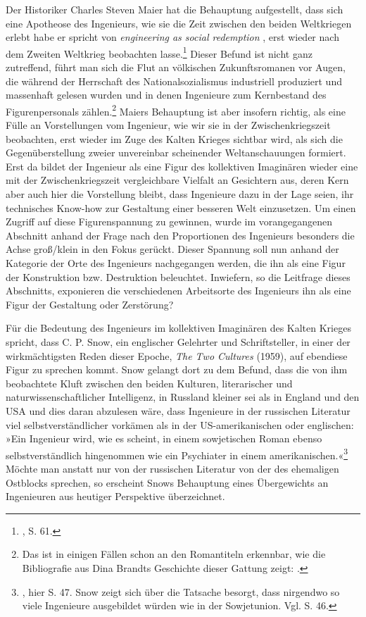 \documentclass[%
	fontsize=10pt,%
	twoside,%
	headings=optiontoheadandtoc,%
	showtrims]{scrbook}
\newcommand{\antiqua}[3]{%
	\fontsize{#1}{#2}%
	\Lyon%
	\addfontfeature{LetterSpace=#3}%
	\selectfont%
}
\newcommand{\regularfontantiqua}{%
	\normalfont%
	\antiqua{9.3bp}{12bp}{.05}%
}
\newcommand{\regularfontdefault}{%
	\regularfontantiqua%
}
\begin{document}
					\-
					\par			
					\newpage%
					\noindent%
					\regularfontdefault%
	\par\noindent Der Historiker Charles Steven Maier hat die Behauptung aufgestellt, dass sich eine Apotheose des Ingenieurs, wie sie die Zeit zwischen den beiden Weltkriegen erlebt habe \textendash{} er spricht von \emph{engineering as social redemption} \textendash{}, erst wieder nach dem Zweiten Weltkrieg beobachten lasse.\footnote{\cite[][]{maier1970a}, S. 61.}  Dieser Befund ist nicht ganz zutreffend, führt man sich die Flut an völkischen Zukunftsromanen vor Augen, die während der Herrschaft des Nationalsozialismus industriell produziert und massenhaft gelesen wurden und in denen Ingenieure zum Kernbestand des Figurenpersonals zählen.\footnote{Das ist in einigen Fällen schon an den Romantiteln erkennbar, wie die Bibliografie aus Dina Brandts Geschichte dieser Gattung zeigt: \cite[][]{brandt2007a}.}  Maiers Behauptung ist aber insofern richtig, als eine Fülle an Vorstellungen vom Ingenieur, wie wir sie in der Zwischenkriegszeit beobachten, erst wieder im Zuge des Kalten Krieges sichtbar wird, als sich die Gegenüberstellung zweier unvereinbar scheinender Weltanschauungen formiert. Erst da bildet der Ingenieur als eine Figur des kollektiven Imaginären wieder eine mit der Zwischenkriegszeit vergleichbare Vielfalt an Gesichtern aus, deren Kern aber auch hier die Vorstellung bleibt, dass Ingenieure dazu in der Lage seien, ihr technisches Know-how zur Gestaltung einer besseren Welt einzusetzen. Um einen Zugriff auf diese Figurenspannung zu gewinnen, wurde im vorangegangenen Abschnitt anhand der Frage nach den Proportionen des Ingenieurs besonders die Achse groß/klein in den Fokus gerückt. Dieser Spannung soll nun anhand der Kategorie der Orte des Ingenieurs nachgegangen werden, die ihn als eine Figur der Konstruktion bzw. Destruktion beleuchtet. Inwiefern, so die Leitfrage dieses Abschnitts, exponieren die verschiedenen Arbeitsorte des Ingenieurs ihn als eine Figur der Gestaltung oder Zerstörung?\par Für die Bedeutung des Ingenieurs im kollektiven Imaginären des Kalten Krieges spricht, dass C. P. Snow, ein englischer Gelehrter und Schriftsteller, in einer der wirkmächtigsten Reden dieser Epoche, \emph{The Two Cultures} (1959), auf ebendiese Figur zu sprechen kommt. Snow gelangt dort zu dem Befund, dass die von ihm beobachtete Kluft zwischen den beiden Kulturen, literarischer und naturwissenschaftlicher Intelligenz, in Russland kleiner sei als in England und den USA und dies daran abzulesen wäre, dass Ingenieure in der russischen Literatur viel selbstverständlicher vorkämen als in der US-amerikanischen oder englischen: »Ein Ingenieur wird, wie es scheint, in einem sowjetischen Roman ebenso selbstverständlich hingenommen wie ein Psychiater in einem amerikanischen.«\footnote{\cite[][]{snow1987a}, hier S. 47. Snow zeigt sich über die Tatsache besorgt, dass nirgendwo so viele Ingenieure ausgebildet würden wie in der Sowjetunion. Vgl. S. 46.}  Möchte man anstatt nur von der russischen Literatur von der des ehemaligen Ostblocks sprechen, so erscheint Snows Behauptung eines Übergewichts an Ingenieuren aus heutiger Perspektive überzeichnet. 
\end{document}
